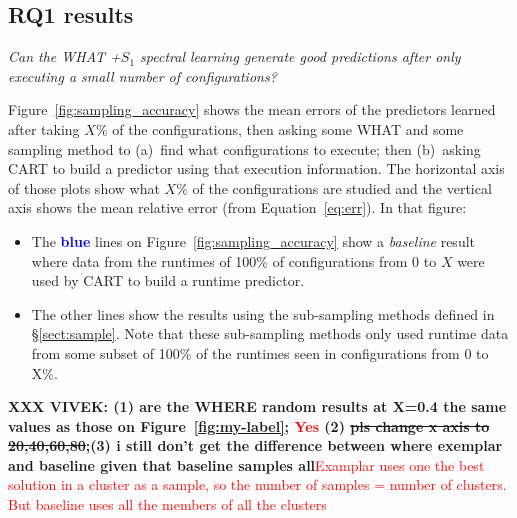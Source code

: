 \documentclass{sig-alternative}
\newcommand{\bi}{\begin{itemize}}%
\newcommand{\ei}{\end{itemize}}
\newcommand{\tion}[1]{\S\ref{sect:#1}}
\newcommand{\fig}[1]{Figure~\ref{fig:#1}}
\newcommand{\eq}[1]{Equation~\ref{eq:#1}}
\begin{document}
\subsection{RQ1 results}
{\em Can the WHAT  +$S_1$ spectral learning generate good predictions after only
executing a small number of configurations?}

\fig{sampling_accuracy} shows the mean errors of the predictors learned
after taking $X$\% of the configurations, then asking some WHAT and some sampling method
to (a)~find what configurations to execute; then (b)~asking CART to build a predictor
using that execution information. The horizontal axis of those plots show what $X$\%
of the configurations are studied and the vertical axis shows the mean relative error (from \eq{err}).
In that figure:
\bi
\item
The \textcolor{blue}{{\bf blue}} lines on \fig{sampling_accuracy} show a {\em baseline} result
where data from the runtimes of 100\% of  configurations from 0 to $X$ were used by CART
to build a runtime predictor.
\item
The other lines show the results using the sub-sampling methods defined in \tion{sample}.
Note that these sub-sampling methods only used  runtime data from
some subset of 100\% of the runtimes seen in configurations
from 0 to X\%.
\ei

{\bf XXX VIVEK: (1) are the WHERE random results at X=0.4 the same values as those on \fig{my-label}; \textcolor{red}{Yes}
(2) \st{pls change x axis to 20,40,60,80};(3) i still don't get the difference between where exemplar
and baseline given that baseline samples all}\textcolor{red}{Examplar uses one the best solution in a cluster as a sample, so the number of samples = number of clusters. But baseline uses all the members of all the clusters}
\end{document}

